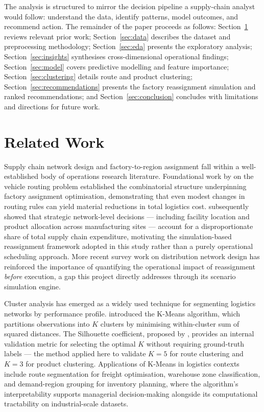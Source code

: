 \documentclass[12pt, a4paper]{article}
\begin{document}
The analysis is structured to mirror the decision pipeline a supply-chain analyst
would follow: understand the data, identify patterns, model outcomes, and
recommend action. The remainder of the paper proceeds as follows:
Section~\ref{sec:related} reviews relevant prior work;
Section~\ref{sec:data} describes the dataset and preprocessing methodology;
Section~\ref{sec:eda} presents the exploratory analysis;
Section~\ref{sec:insights} synthesises cross-dimensional operational findings;
Section~\ref{sec:model} covers predictive modelling and feature importance;
Section~\ref{sec:clustering} details route and product clustering;
Section~\ref{sec:recommendations} presents the factory reassignment simulation
and ranked recommendations; and Section~\ref{sec:conclusion} concludes with
limitations and directions for future work.

\section{Related Work}
\label{sec:related}

Supply chain network design and factory-to-region assignment fall within a
well-established body of operations research literature. Foundational work by
\citet{dantzig1959} on the vehicle routing problem established the combinatorial
structure underpinning factory assignment optimisation, demonstrating that even
modest changes in routing rules can yield material reductions in total logistics
cost. \citet{chopra2007} subsequently showed that strategic network-level
decisions --- including facility location and product allocation across
manufacturing sites --- account for a disproportionate share of total supply chain
expenditure, motivating the simulation-based reassignment framework adopted in
this study rather than a purely operational scheduling approach. More recent
survey work on distribution network design \citep{farahani2011} has reinforced
the importance of quantifying the operational impact of reassignment
\emph{before} execution, a gap this project directly addresses through its
scenario simulation engine.

Cluster analysis has emerged as a widely used technique for segmenting logistics
networks by performance profile. \citet{macqueen1967} introduced the K-Means
algorithm, which partitions observations into $K$ clusters by minimising
within-cluster sum of squared distances. The Silhouette coefficient, proposed by
\citet{rousseeuw1987}, provides an internal validation metric for selecting the
optimal $K$ without requiring ground-truth labels --- the method applied here to
validate $K = 5$ for route clustering and $K = 3$ for product clustering.
Applications of K-Means in logistics contexts include route segmentation for
freight optimisation, warehouse zone classification, and demand-region grouping
for inventory planning, where the algorithm's interpretability supports
managerial decision-making alongside its computational tractability on
industrial-scale datasets.
\end{document}
